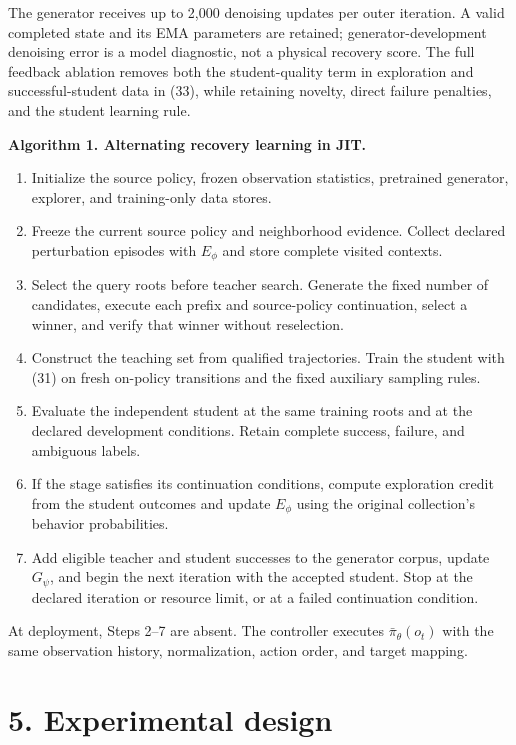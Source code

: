 \documentclass[
  american,
  11pt,
  a4paper,
]{article}
\providecommand{\tightlist}{%
  \setlength{\itemsep}{0pt}\setlength{\parskip}{0pt}}
\begin{document}
The generator receives up to 2,000 denoising updates per outer
iteration. A valid completed state and its EMA parameters are retained;
generator-development denoising error is a model diagnostic, not a
physical recovery score. The full feedback ablation removes both the
student-quality term in exploration and successful-student data in (33),
while retaining novelty, direct failure penalties, and the student
learning rule.

\textbf{Algorithm 1. Alternating recovery learning in JIT.}

\begin{enumerate}
\def\labelenumi{\arabic{enumi}.}
\tightlist
\item
  Initialize the source policy, frozen observation statistics,
  pretrained generator, explorer, and training-only data stores.
\item
  Freeze the current source policy and neighborhood evidence. Collect
  declared perturbation episodes with \(E_\phi\) and store complete
  visited contexts.
\item
  Select the query roots before teacher search. Generate the fixed
  number of candidates, execute each prefix and source-policy
  continuation, select a winner, and verify that winner without
  reselection.
\item
  Construct the teaching set from qualified trajectories. Train the
  student with (31) on fresh on-policy transitions and the fixed
  auxiliary sampling rules.
\item
  Evaluate the independent student at the same training roots and at the
  declared development conditions. Retain complete success, failure, and
  ambiguous labels.
\item
  If the stage satisfies its continuation conditions, compute
  exploration credit from the student outcomes and update \(E_\phi\)
  using the original collection's behavior probabilities.
\item
  Add eligible teacher and student successes to the generator corpus,
  update \(G_\psi\), and begin the next iteration with the accepted
  student. Stop at the declared iteration or resource limit, or at a
  failed continuation condition.
\end{enumerate}

At deployment, Steps 2--7 are absent. The controller executes
\(\bar\pi_\theta(o_t)\) with the same observation history,
normalization, action order, and target mapping.

\section{5. Experimental design}\label{experimental-design}
\end{document}
